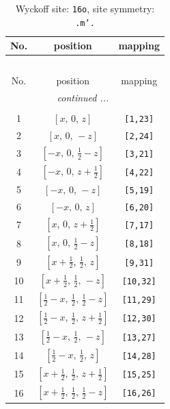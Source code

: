 \documentclass[fleqn,8pt]{jsarticle}
\begin{document}
\renewcommand{\arraystretch}{1.2}
\begin{longtable}{ccc}
\caption{Wyckoff site: {\tt 16o}, site symmetry: {\tt .m'.}}
 \\
 \hline \hline
No. & position & mapping \\ \hline \endfirsthead

\multicolumn{2}{l}{\tablename\ \thetable{}} \\
 \hline \hline
No. & position & mapping \\ \hline \endhead

 \hline \hline
\multicolumn{2}{r}{\footnotesize\it continued ...} \\ \endfoot

 \hline \hline
\multicolumn{2}{r}{} \\ \endlastfoot

1 & $\left[ x,\, 0,\, z \right]$ & {\tt [1,23]} \\ \hline
2 & $\left[ x,\, 0,\, - z \right]$ & {\tt [2,24]} \\ \hline
3 & $\left[ - x,\, 0,\, \frac{1}{2} - z \right]$ & {\tt [3,21]} \\ \hline
4 & $\left[ - x,\, 0,\, z + \frac{1}{2} \right]$ & {\tt [4,22]} \\ \hline
5 & $\left[ - x,\, 0,\, - z \right]$ & {\tt [5,19]} \\ \hline
6 & $\left[ - x,\, 0,\, z \right]$ & {\tt [6,20]} \\ \hline
7 & $\left[ x,\, 0,\, z + \frac{1}{2} \right]$ & {\tt [7,17]} \\ \hline
8 & $\left[ x,\, 0,\, \frac{1}{2} - z \right]$ & {\tt [8,18]} \\ \hline
9 & $\left[ x + \frac{1}{2},\, \frac{1}{2},\, z \right]$ & {\tt [9,31]} \\ \hline
10 & $\left[ x + \frac{1}{2},\, \frac{1}{2},\, - z \right]$ & {\tt [10,32]} \\ \hline
11 & $\left[ \frac{1}{2} - x,\, \frac{1}{2},\, \frac{1}{2} - z \right]$ & {\tt [11,29]} \\ \hline
12 & $\left[ \frac{1}{2} - x,\, \frac{1}{2},\, z + \frac{1}{2} \right]$ & {\tt [12,30]} \\ \hline
13 & $\left[ \frac{1}{2} - x,\, \frac{1}{2},\, - z \right]$ & {\tt [13,27]} \\ \hline
14 & $\left[ \frac{1}{2} - x,\, \frac{1}{2},\, z \right]$ & {\tt [14,28]} \\ \hline
15 & $\left[ x + \frac{1}{2},\, \frac{1}{2},\, z + \frac{1}{2} \right]$ & {\tt [15,25]} \\ \hline
16 & $\left[ x + \frac{1}{2},\, \frac{1}{2},\, \frac{1}{2} - z \right]$ & {\tt [16,26]} \\
\end{longtable}
\end{document}

